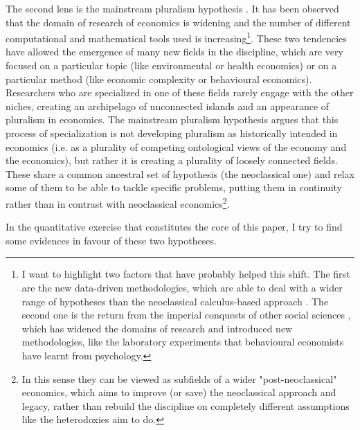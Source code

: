 \documentclass[a4paper, 11pt, headings=standardclasses, tablecaptionsbelow]{scrartcl}
\begin{document}
The second lens is the mainstream pluralism hypothesis \parencite{davis2006,davis2019a,davis2019b,cedrini2018}. It has been observed that the domain of research of economics is widening and the number of different computational and mathematical tools used is increasing\footnote{I want to highlight two factors that have probably helped this shift. The first are the new data-driven methodologies, which are able to deal with a wider range of hypotheses than the neoclassical calculus-based approach \parencite{cherrier2018a}. The second one is the return from the imperial conquests of other social sciences \parencite{fourcade2015,marchionatti2017}, which has widened the domains of research and introduced new methodologies, like the laboratory experiments that behavioural economists have learnt from psychology.}. These two tendencies have allowed the emergence of many new fields in the discipline, which are very focused on a particular topic (like environmental or health economics) or on a particular method (like economic complexity or behavioural economics).
Researchers who are specialized in one of these fields rarely engage with the other niches, creating an archipelago of unconnected islands and an appearance of pluralism in economics.
The mainstream pluralism hypothesis argues that this process of specialization is not developing pluralism as historically intended in economics (i.e. as a plurality of competing ontological views of the economy and the economics), but rather it is creating a plurality of loosely connected fields. These share a common ancestral set of hypothesis (the neoclassical one) and relax some of them to be able to tackle specific problems, putting them in continuity rather than in contrast with neoclassical economics\footnote{In this sense they can be viewed as subfields of a wider "post-neoclassical" economics, which aims to improve (or save) the neoclassical approach and legacy, rather than rebuild the discipline on completely different assumptions like the heterodoxies aim to do.}.

In the quantitative exercise that constitutes the core of this paper, I try to find some evidences in favour of these two hypotheses.
\end{document}
